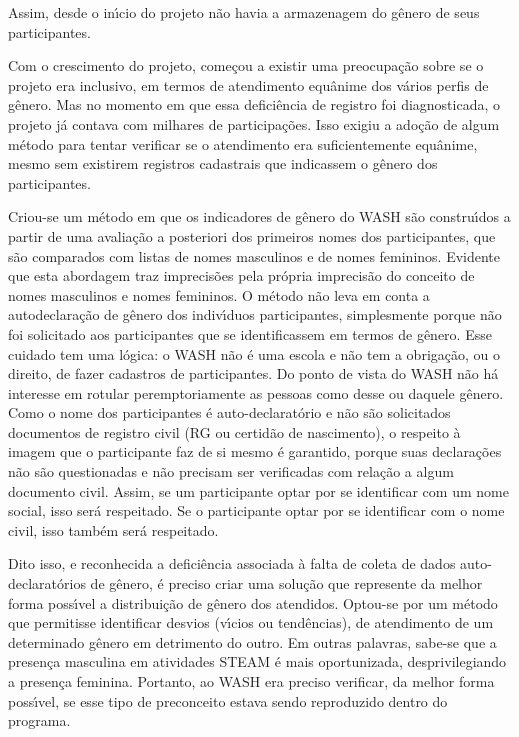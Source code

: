 \documentclass[
12pt,		%
openright,	%
twoside,  %
a4paper,			%
chapter=TITLE,		%
english,			%
french,				%
spanish,			%
brazil				%
]{USPSC-classe/USPSC_RedarTex}
\begin{document}
Assim, desde o in\'{\i}cio do projeto n\~ao havia a armazenagem do g\^enero de seus participantes.








Com o crescimento do projeto, come\c{c}ou a existir uma preocupa\c{c}\~ao sobre se o projeto era inclusivo, em termos de atendimento equ\^anime dos v\'arios perfis de g\^enero. Mas no momento em que essa defici\^encia de registro foi diagnosticada, o projeto j\'a contava com milhares de participa\c{c}\~oes. Isso exigiu a ado\c{c}\~ao de algum m\'etodo para tentar verificar se o atendimento era suficientemente equ\^anime, mesmo sem existirem registros cadastrais que indicassem o g\^enero dos participantes.








Criou-se um m\'etodo em que os indicadores de g\^enero do WASH s\~ao constru\'{\i}dos a partir de uma avalia\c{c}\~ao a posteriori dos primeiros nomes dos participantes, que s\~ao comparados com listas de nomes masculinos e de nomes femininos. Evidente que esta abordagem traz imprecis\~oes pela pr\'opria imprecis\~ao do conceito de nomes masculinos e nomes femininos. O m\'etodo n\~ao leva em conta a autodeclara\c{c}\~ao de g\^enero dos indiv\'{\i}duos participantes, simplesmente porque n\~ao foi solicitado aos participantes que se identificassem em termos de g\^enero. Esse cuidado tem uma l\'ogica: o WASH n\~ao \'e uma escola e n\~ao tem a obriga\c{c}\~ao, ou o direito, de fazer cadastros de participantes. Do ponto de vista do WASH n\~ao h\'a interesse em rotular peremptoriamente as pessoas como desse ou daquele g\^enero. Como o nome dos participantes \'e auto-declarat\'orio e n\~ao s\~ao solicitados documentos de registro civil (RG ou certid\~ao de nascimento), o respeito \`a imagem que o participante faz de si mesmo \'e garantido, porque suas declara\c{c}\~oes n\~ao s\~ao questionadas e n\~ao precisam ser verificadas com rela\c{c}\~ao a algum documento civil. Assim, se um participante optar por se identificar com um nome social, isso ser\'a respeitado. Se o participante optar por se identificar com o nome civil, isso tamb\'em ser\'a respeitado.








Dito isso, e reconhecida a defici\^encia associada \`a falta de coleta de dados auto-declarat\'orios de g\^enero, \'e preciso criar uma solu\c{c}\~ao que represente da melhor forma poss\'{\i}vel a distribui\c{c}\~ao de g\^enero dos atendidos. Optou-se por um m\'etodo que permitisse identificar desvios (v\'{\i}cios ou tend\^encias), de atendimento de um determinado g\^enero em detrimento do outro. Em outras palavras, sabe-se que a presen\c{c}a masculina em atividades STEAM \'e mais oportunizada, desprivilegiando a presen\c{c}a feminina. Portanto, ao WASH era preciso verificar, da melhor forma poss\'{\i}vel, se esse tipo de preconceito estava sendo reproduzido dentro do programa.
\end{document}
